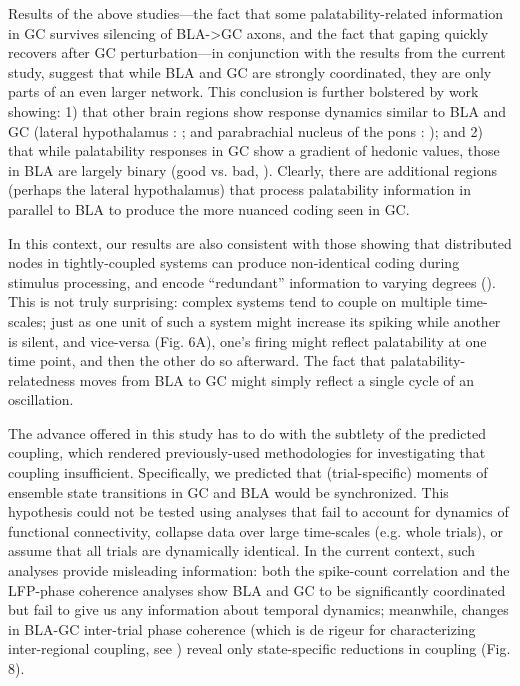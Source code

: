 \begin{refsection}
Results of the above studies—the fact that some palatability-related information in GC survives silencing of BLA->GC axons, and the fact that gaping quickly recovers after GC perturbation—in conjunction with the results from the current study, suggest that while BLA and GC are strongly coordinated, they are only parts of an even larger network. This conclusion is further bolstered by work showing: 1) that other brain regions show response dynamics similar to BLA and GC (lateral hypothalamus : \cite{li2013a}; and parabrachial nucleus of the pons : \cite{baez-santiago2016a}); and 2) that while palatability responses in GC show a gradient of hedonic values, those in BLA are largely binary (good vs. bad, \cite{fontanini2009a,sadacca2012a}). Clearly, there are additional regions (perhaps the lateral hypothalamus) that process palatability information in parallel to BLA to produce the more nuanced coding seen in GC. 

In this context, our results are also consistent with those showing that distributed nodes in tightly-coupled systems can produce non-identical coding during stimulus processing, and encode “redundant” information to varying degrees (\cite{siegel2015a,brincat2018a,lara2018a,saravani2019a}). This is not truly surprising: complex systems tend to couple on multiple time-scales; just as one unit of such a system might increase its spiking while another is silent, and vice-versa (Fig. 6A), one’s firing might reflect palatability at one time point, and then the other do so afterward. The fact that palatability-relatedness moves from BLA to GC might simply reflect a single cycle of an oscillation.

The advance offered in this study has to do with the subtlety of the predicted coupling, which rendered previously-used methodologies for investigating that coupling insufficient. Specifically, we predicted that (trial-specific) moments of ensemble state transitions in GC and BLA would be synchronized. This hypothesis could not be tested using analyses that fail to account for dynamics of functional connectivity, collapse data over large time-scales (e.g. whole trials), or assume that all trials are dynamically identical. In the current context, such analyses provide misleading information: both the spike-count correlation and the LFP-phase coherence analyses show BLA and GC to be significantly coordinated but fail to give us any information about temporal dynamics; meanwhile, changes in BLA-GC inter-trial phase coherence (which is de rigeur for characterizing inter-regional coupling, see \cite{engel2020a,kramer2020a,zareian2020a,zielinski2019a}) reveal only state-specific reductions in coupling (Fig. 8).


\end{refsection}
